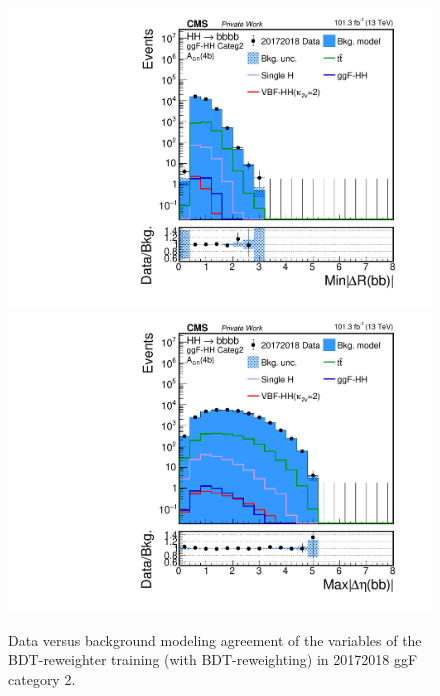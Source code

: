\begin{figure}[htbp!]
\begin{center}
\includegraphics[width=0.24\linewidth]{Figures/Modeling/background/plotsDatadrivenWithBDT/20172018/GGFcateg2_CR_110/Histogram/plot20172018_min_4b_deltaR_Btag4_GGFcateg2_CR_110_Histogram_log.pdf}
\includegraphics[width=0.24\linewidth]{Figures/Modeling/background/plotsDatadrivenWithBDT/20172018/GGFcateg2_CR_110/Histogram/plot20172018_max_4b_deltaEta_Btag4_GGFcateg2_CR_110_Histogram_log.pdf}
\end{center}
\caption{Data versus background modeling agreement of the variables of the BDT-reweighter training (with BDT-reweighting) in 20172018 ggF category 2.}
\label{bkg:fig:bdtregvarggf2_20172018}
\end{figure}

